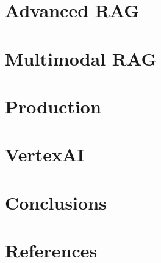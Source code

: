 \section[Adv]{Advanced RAG}


\section[MM]{Multimodal RAG}


\section[Prod]{Production}


\section[VertexAI]{VertexAI}


\section[End]{Conclusions}


\section[Refs]{References}

